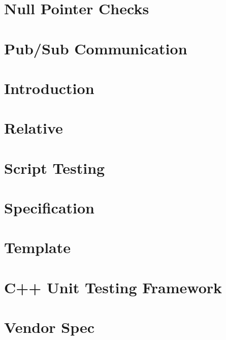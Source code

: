 \documentclass[twoside]{book}
\newcommand{\+}{\discretionary{\mbox{\scriptsize$\hookleftarrow$}}{}{}}
\begin{document}
\chapter{Null Pointer Checks}
\label{doc_decisions_null_pointer_checks_md}
\hypertarget{doc_decisions_null_pointer_checks_md}{}

\chapter{Pub/\+Sub Communication}
\label{doc_decisions_pubsub_md}
\hypertarget{doc_decisions_pubsub_md}{}

\chapter{Introduction}
\label{doc_decisions_README_md}
\hypertarget{doc_decisions_README_md}{}

\chapter{Relative}
\label{doc_decisions_relative_md}
\hypertarget{doc_decisions_relative_md}{}

\chapter{Script Testing}
\label{doc_decisions_script_testing_md}
\hypertarget{doc_decisions_script_testing_md}{}

\chapter{Specification}
\label{doc_decisions_specification_md}
\hypertarget{doc_decisions_specification_md}{}

\chapter{Template}
\label{doc_decisions_template_md}
\hypertarget{doc_decisions_template_md}{}

\chapter{C++ Unit Testing Framework}
\label{doc_decisions_unit_testing_md}
\hypertarget{doc_decisions_unit_testing_md}{}

\chapter{Vendor Spec}
\label{doc_decisions_vendor_spec_md}
\hypertarget{doc_decisions_vendor_spec_md}{}

\end{document}
